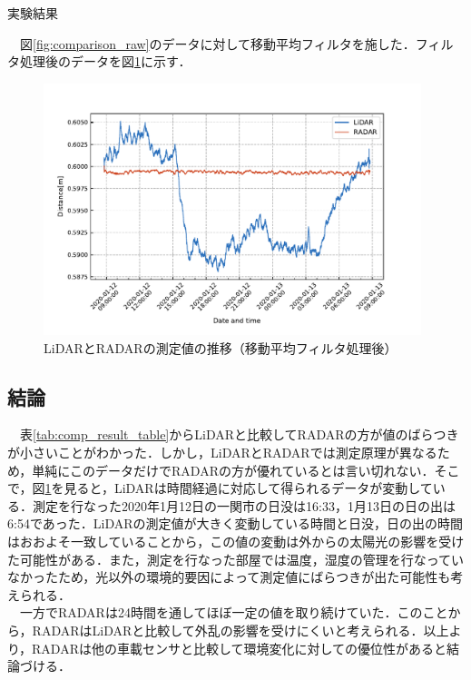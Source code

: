\begin{table}[htbp]
    \centering
    \caption{実験結果}
    
    \label{tab:comp_result_table}
\end{table}


　図\ref{fig:comparison_raw}のデータに対して移動平均フィルタを施した．フィルタ処理後のデータを図\ref{fig:comparison_filtered60}に示す．
\begin{figure}[H]
    \centering
    \includegraphics[width=11cm]{./fig/comparison_filtered60.pdf}
    \caption{LiDARとRADARの測定値の推移（移動平均フィルタ処理後）}
    \label{fig:comparison_filtered60}
\end{figure}

\subsection{結論}
　表\ref{tab:comp_result_table}からLiDARと比較してRADARの方が値のばらつきが小さいことがわかった．しかし，LiDARとRADARでは測定原理が異なるため，単純にこのデータだけでRADARの方が優れているとは言い切れない．そこで，図\ref{fig:comparison_filtered60}を見ると，LiDARは時間経過に対応して得られるデータが変動している．測定を行なった2020年1月12日の一関市の日没は16:33，1月13日の日の出は6:54であった．LiDARの測定値が大きく変動している時間と日没，日の出の時間はおおよそ一致していることから，この値の変動は外からの太陽光の影響を受けた可能性がある．また，測定を行なった部屋では温度，湿度の管理を行なっていなかったため，光以外の環境的要因によって測定値にばらつきが出た可能性も考えられる．\\
　一方でRADARは24時間を通してほぼ一定の値を取り続けていた．このことから，RADARはLiDARと比較して外乱の影響を受けにくいと考えられる．以上より，RADARは他の車載センサと比較して環境変化に対しての優位性があると結論づける．

